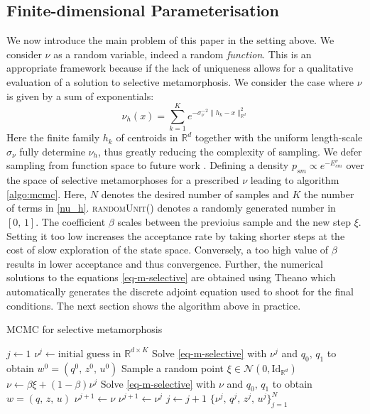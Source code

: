\documentclass[runningheads]{llncs}
\newcommand{\Rd}{\mathbb{R}^{d}}
\newcommand{\RdK}{\mathbb{R}^{d\times K}}
\begin{document}
\subsection{Finite-dimensional Parameterisation}\label{subs:finite-dim-param}

We now introduce the main problem of this paper in the setting above. We
consider $\nu$ as a random variable, indeed a random \emph{function}. This is an
appropriate framework because if the lack of uniqueness allows for a qualitative
evaluation of a solution to selective metamorphosis. We consider the case where
$\nu$ is given by a sum of exponentials:
\begin{equation}\label{nu_h}
    \nu_h (x) = \sum_{k=1}^K e^{ -\sigma_\nu^{-2}\|h_k - x\|_{\Rd}^2}
\end{equation}
Here the finite family $h_k$ of centroids in $\Rd$ together with the uniform
length-scale $\sigma_\nu$ fully determine $\nu_h$, thus greatly reducing the
complexity of sampling. We defer sampling from function space to future work
\cite{bockarnaudoncotter2019}. Defining a density $p_{sm} \propto e^{-
E_{sm}^\nu}$ over the space of selective metamorphoses for a prescribed $\nu$
leading to algorithm \ref{algo:mcmc}. Here, $N$ denotes the desired number of
samples and $K$ the number of terms in \eqref{nu_h}. \textsc{randomUnit()}
denotes a randomly generated number in $[0,\,1]$. The coefficient $\beta$ scales
between the previoius sample and the new step $\xi$. Setting it too low
increases the acceptance rate by taking shorter steps at the cost of slow
exploration of the state space. Conversely, a too high value of $\beta$ results
in lower acceptance and thus convergence. Further, the numerical solutions to
the equations \eqref{eq-m-selective} are obtained using Theano
\cite{team2016theano} which automatically generates the discrete adjoint
equation used to shoot for the final conditions. The next section shows the
algorithm above in practice.
\begin{algorithm}[h!]
\begin{algorithmic}
\caption{MCMC for selective metamorphosis}\label{algo:mcmc}
\Procedure{mcmcSM}{$N$, $K$, $q_0$, $q_1$, $\beta\in (0,1]$}
\State $j \gets 1$
\State $\nu^j \gets \text{initial guess in } \RdK$
\State Solve \eqref{eq-m-selective} with $\nu^j$ and $q_0,\,q_1$ to obtain $w^0 = (q^0,\, z^0,\, u^0)$
\State Sample a random point $\xi \in \mathcal N(0, \text{Id}_{\mathbb R^d})$
\State $\nu \gets \beta \xi + (1-\beta) \nu^j$
\State Solve \eqref{eq-m-selective} with $\nu$ and $q_0,\,q_1$ to obtain $w = (q,\, z,\, u)$
    \State $\nu^{j+1} \gets \nu$
\Else
    \State $\nu^{j+1} \gets \nu^j$
\EndIf
\State $j\gets j+1$
\EndWhile
\Return $\{\nu^j,\, q^j,\, z^j,\, u^j\}_{j=1}^N$
\EndProcedure
\end{algorithmic}
\end{algorithm}
\end{document}
